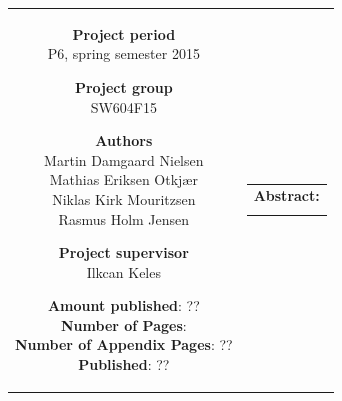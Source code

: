 \begin{nopagebreak}
{\begin{tabular}{cc}
{        \textbf{Project period}     \\ P6, spring semester 2015  \\

        \textbf{Project group}      \\ SW604F15                  \\

        \textbf{Authors}            \\
        Martin Damgaard Nielsen     \\
        Mathias Eriksen Otkjær      \\
        Niklas Kirk Mouritzsen      \\
        Rasmus Holm Jensen          \\

        \textbf{Project supervisor} \\ Ilkcan Keles    \\

        \textbf{Amount published}: ??                  \\
        \textbf{Number of Pages}: \pageref{LastPage}   \\
        \textbf{Number of Appendix Pages}: ??          \\
        \textbf{Published}: ??                         \\

        \vfill 

    } &
    \parbox{7cm}
    {
        \vspace{.15cm}
        \hfill 
        \begin{tabular}{l}
            {\bf Abstract:}\bigskip \\
            \fbox{
                \parbox{7cm}
                {
                    \bigskip
                    {\vfill{\small \bigskip}}
                }
            }
        \end{tabular}
    }

\end{tabular}}
\\ \\ \\ \\ \\ \\ \\ \\ \\ \\ \\ \\ \\ \\

\begin{center}
\end{center}

\restoregeometry
\end{nopagebreak}